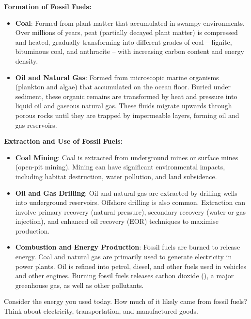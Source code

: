 \textbf{Formation of Fossil Fuels:}

\begin{itemize}
    \item \textbf{Coal}: Formed from plant matter that accumulated in swampy environments.  Over millions of years, peat (partially decayed plant matter) is compressed and heated, gradually transforming into different grades of coal – lignite, bituminous coal, and anthracite – with increasing carbon content and energy density.
    \item \textbf{Oil and Natural Gas}:  Formed from microscopic marine organisms (plankton and algae) that accumulated on the ocean floor.  Buried under sediment, these organic remains are transformed by heat and pressure into liquid oil and gaseous natural gas.  These fluids migrate upwards through porous rocks until they are trapped by impermeable layers, forming oil and gas reservoirs.
\end{itemize}

\textbf{Extraction and Use of Fossil Fuels:}

\begin{itemize}
    \item \textbf{Coal Mining}: Coal is extracted from underground mines or surface mines (open-pit mining).  Mining can have significant environmental impacts, including habitat destruction, water pollution, and land subsidence.
    \item \textbf{Oil and Gas Drilling}:  Oil and natural gas are extracted by drilling wells into underground reservoirs.  Offshore drilling is also common.  Extraction can involve primary recovery (natural pressure), secondary recovery (water or gas injection), and enhanced oil recovery (EOR) techniques to maximise production.
    \item \textbf{Combustion and Energy Production}: Fossil fuels are burned to release energy.  Coal and natural gas are primarily used to generate electricity in power plants.  Oil is refined into petrol, diesel, and other fuels used in vehicles and other engines.  Burning fossil fuels releases carbon dioxide (), a major greenhouse gas, as well as other pollutants.
\end{itemize}

\begin{stopandthink}
Consider the energy you used today.  How much of it likely came from fossil fuels?  Think about electricity, transportation, and manufactured goods.
\end{stopandthink}

